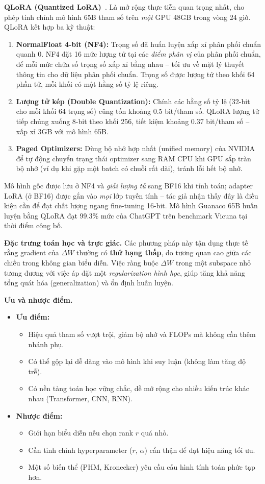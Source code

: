 \textbf{QLoRA (Quantized LoRA)}~\cite{dettmers2023qlora}.
Là mở rộng thực tiễn quan trọng nhất, cho phép tinh chỉnh mô hình 65B tham số trên \emph{một} GPU 48GB trong vòng 24 giờ. QLoRA kết hợp ba kỹ thuật:
\begin{enumerate}
	\item \textbf{NormalFloat 4-bit (NF4):} Trọng số đã huấn luyện xấp xỉ phân phối chuẩn quanh 0. NF4 đặt 16 mức lượng tử tại các \emph{điểm phân vị} của phân phối chuẩn, để mỗi mức chứa số trọng số xấp xỉ bằng nhau -- tối ưu về mặt lý thuyết thông tin cho dữ liệu phân phối chuẩn. Trọng số được lượng tử theo khối 64 phần tử, mỗi khối có một hằng số tỷ lệ riêng.
	\item \textbf{Lượng tử kép (Double Quantization):} Chính các hằng số tỷ lệ (32-bit cho mỗi khối 64 trọng số) cũng tốn khoảng 0.5 bit/tham số. QLoRA lượng tử tiếp chúng xuống 8-bit theo khối 256, tiết kiệm khoảng 0.37 bit/tham số -- xấp xỉ 3GB với mô hình 65B.
	\item \textbf{Paged Optimizers:} Dùng bộ nhớ hợp nhất (unified memory) của NVIDIA để tự động chuyển trạng thái optimizer sang RAM CPU khi GPU sắp tràn bộ nhớ (ví dụ khi gặp một batch có chuỗi rất dài), tránh lỗi hết bộ nhớ.
\end{enumerate}
Mô hình gốc được lưu ở NF4 và \emph{giải lượng tử} sang BF16 khi tính toán; adapter LoRA (ở BF16) được gắn vào \emph{mọi} lớp tuyến tính -- tác giả nhận thấy đây là điều kiện cần để đạt chất lượng ngang fine-tuning 16-bit. Mô hình Guanaco 65B huấn luyện bằng QLoRA đạt 99.3\% mức của ChatGPT trên benchmark Vicuna tại thời điểm công bố.

\textbf{Đặc trưng toán học và trực giác.}  
Các phương pháp này tận dụng thực tế rằng gradient của $\Delta W$ thường có \textbf{thứ hạng thấp}, do tương quan cao giữa các chiều trong không gian biểu diễn.  
Việc ràng buộc $\Delta W$ trong một subspace nhỏ tương đương với việc áp đặt một \textit{regularization hình học}, giúp tăng khả năng tổng quát hóa (generalization) và ổn định huấn luyện.

\textbf{Ưu và nhược điểm.}
\begin{itemize}
	\item \textbf{Ưu điểm:}
	\begin{itemize}
		\item Hiệu quả tham số vượt trội, giảm bộ nhớ và FLOPs mà không cần thêm nhánh phụ.  
		\item Có thể gộp lại dễ dàng vào mô hình khi suy luận (không làm tăng độ trễ).  
		\item Có nền tảng toán học vững chắc, dễ mở rộng cho nhiều kiến trúc khác nhau (Transformer, CNN, RNN).  
	\end{itemize}
	\item \textbf{Nhược điểm:}
	\begin{itemize}
		\item Giới hạn biểu diễn nếu chọn rank $r$ quá nhỏ.  
		\item Cần tinh chỉnh hyperparameter ($r$, $\alpha$) cẩn thận để đạt hiệu năng tối ưu.  
		\item Một số biến thể (PHM, Kronecker) yêu cầu cấu hình tính toán phức tạp hơn.  
	\end{itemize}
\end{itemize}

